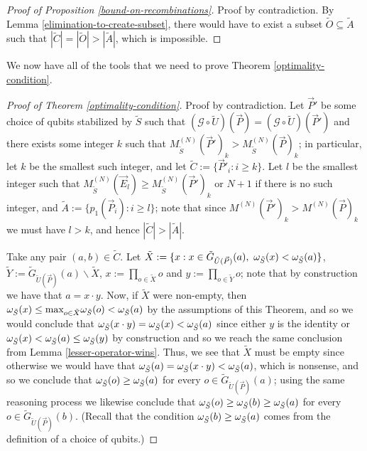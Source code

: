 \documentclass[twocolumn,showpacs,preprintnumbers,amsmath,amssymb,nofootinbib,pra,floatfix]{revtex4-1}
\newcommand{\lst}{\vec}
\newcommand{\set}{\tilde}
\newcommand{\genfun}{\mathcal{G}}
\begin{document}
\begin{proof}[Proof of Proposition \ref{bound-on-recombinations}]
Proof by contradiction.  By Lemma \ref{elimination-to-create-subset}, there would have to exist a subset $\set O\subseteq\set A$ such that $|\set C|=|\set O|>|\set A|$, which is impossible.
\end{proof}
We now have all of the tools that we need to prove Theorem \ref{optimality-condition}.

\begin{proof}[Proof of Theorem \ref{optimality-condition}]
Proof by contradiction.  Let $\lst P'$ be some choice of qubits stabilized by $\set S$ such that $(\genfun\circ\set U)(\lst P)=(\genfun\circ\set U)(\lst P')$ and there exists some integer $k$ such that $M^{(N)}_{\set S}(\lst P')_k > M^{(N)}_{\set S}(\lst P)_k$;  in particular, let $k$ be the smallest such integer, and let $\set C:=\{\lst P'_i : i \ge k\}$.  Let $l$ be the smallest integer such that $M^{(N)}_{\set S}(\lst E_l)\ge M^{(N)}_{\set S}(\lst P')_k$ or $N+1$ if there is no such integer, and $\set A := \{p_1(\lst P_i) : i \ge l\}$; note that since $M^{(N)}(\lst P')_k > M^{(N)}(\lst P)_k$ we must have $l>k$, and hence $|\set C| > |\set A|$.

Take any pair $(a,b)\in\set C$.  Let $\set X:=\{x : x\in \set G_{\set U(\lst P)}(a),\,\, \om_{\set S}(x) < \om_{\set S}(a)\}$, $\set Y:=\set G_{\set U(\lst P)}(a)\backslash \set X$, $x := \prod_{o\in\set X} o$ and $y := \prod_{o\in\set Y} o$;  note that by construction we have that $a=x\cdot y$.  Now, if $\set X$ were non-empty, then $\om_{\set S}(x) \le \max_{o\in \set X} \om_{\set S}(o) < \om_{\set S}(a)$ by the assumptions of this Theorem, and so we would conclude that $\om_{\set S}(x\cdot y) = \om_{\set S}(x) < \om_{\set S}(a)$ since either $y$ is the identity or $\om_{\set S}(x)<\om_{\set S}(a)\le \om_{\set S}(y)$ by construction and so we reach the same conclusion from Lemma \ref{lesser-operator-wins}.  Thus, we see that $\set X$ must be empty since otherwise we would have that $\om_{\set S}(a)=\om_{\set S}(x\cdot y)<\om_{\set S}(a)$, which is nonsense, and so we conclude that $\om_{\set S}(o)\ge \om_{\set S}(a)$ for every $o\in\set G_{\set U(\lst P)}(a)$; using the same reasoning process we likewise conclude that $\om_{\set S}(o)\ge \om_{\set S}(b)\ge \om_{\set S}(a)$ for every $o\in\set G_{\set U(\lst P)}(b)$.  (Recall that the condition $\om_{\set S}(b)\ge \om_{\set S}(a)$ comes from the definition of a choice of qubits.)


\end{proof}
\end{document}
